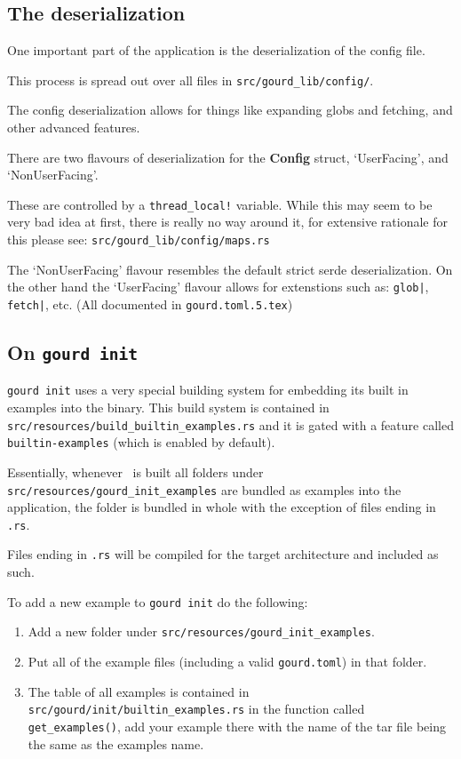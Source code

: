 \subsection{The deserialization}\label{sec:serde}

One important part of the application is the deserialization of the
config file.

This process is spread out over all files in \texttt{src/gourd\_lib/config/}.

The config deserialization allows for things like expanding globs and
fetching, and other advanced features.

There are two flavours of deserialization for the \textbf{Config} struct,
`UserFacing', and `NonUserFacing'.

These are controlled by a \texttt{thread\_local!} variable.
While this may seem to be very bad idea at first, there is really no way
around it, for extensive rationale for this please see:
\texttt{src/gourd\_lib/config/maps.rs}

The `NonUserFacing' flavour resembles the default strict serde deserialization.
On the other hand the `UserFacing' flavour allows for extenstions such as:
\texttt{glob|}, \texttt{fetch|}, etc. (All documented in \texttt{gourd.toml.5.tex})

\subsection{On \texttt{gourd init}}\label{sec:builtin}

\texttt{gourd init} uses a very special building system for embedding its
built in examples into the binary. This build system is contained
in \texttt{src/resources/build\_builtin\_examples.rs} and it is gated with
a feature called \texttt{builtin-examples} (which is enabled by default).

Essentially, whenever \gourd\ is built all folders under
\texttt{src/resources/gourd\_init\_examples} are bundled as examples into the
application, the folder is bundled in whole with the exception of files ending in \texttt{.rs}.

Files ending in \texttt{.rs} will be compiled for the target architecture and included
as such.

To add a new example to \texttt{gourd init} do the following:

\begin{enumerate}
  \item Add a new folder under \texttt{src/resources/gourd\_init\_examples}.
  \item Put all of the example files (including a valid \texttt{gourd.toml}) in that folder.
  \item The table of all examples is contained in \texttt{src/gourd/init/builtin\_examples.rs}
  in the function called \texttt{get\_examples()}, add your example there with the name
  of the tar file being the same as the examples name.
\end{enumerate}

